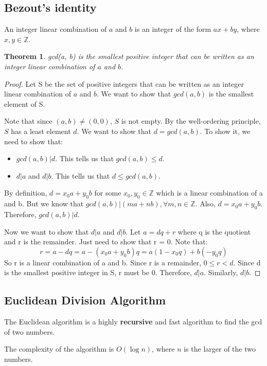 \documentclass[letterpaper,12pt,oneside]{article}
\newtheorem{theorem}{Theorem}
\begin{document}
\subsection{Bezout's identity}
An integer linear combination of $a$ and $b$ is an integer of the form $ax +
    by$, where $x, y \in \mathbb{Z}$.
\begin{theorem}
    gcd(a, b) is the smallest positive integer that can be written as an integer linear combination of $a$ and $b$.
\end{theorem}
\begin{proof}
    Let S be the set of positive integers that can be written as an integer linear combination of $a$ and $b$. We want to show that $gcd(a, b)$ is the smallest element of S.

    Note that since $(a, b) \neq (0, 0)$, $S$ is not empty. By the well-ordering
    principle, $S$ has a least element $d$. We want to show that $d = gcd(a, b)$.
    To show it, we need to show that: \begin{itemize}
        \item $gcd(a ,b) | d$. This tells us that $gcd(a, b) \leq d$.
        \item $d | a$ and $d | b$. This tells us that $d \leq gcd(a, b)$.
    \end{itemize}

    By definition, $d=x_0a+y_0b$ for some $x_0, y_0 \in \mathbb{Z}$ which is a
    linear combination of a and b. But we know that $gcd(a, b) | (ma + nb),\forall
        m, n \in \mathbb{Z}$. Also, $d = x_0a + y_0b$. Therefore, $gcd(a, b) | d$.

    Now we want to show that $d | a$ and $d | b$. Let $a=dq+r$ where q is the
    quotient and r is the remainder. Just need to show that r = 0. Note that: \[
        r = a - dq = a - (x_0a + y_0b)q = a(1-x_0q) + b(-y_0q)
    \]
    So r is a linear combination of a and b. Since r is a remainder, $0 \leq r <
        d$. Since d is the smallest positive integer in S, r must be 0. Therefore, $d |
        a$. Similarly, $d | b$.
\end{proof}

\subsection{Euclidean Division Algorithm}
The Euclidean algorithm is a highly \textbf{recursive} and fast algorithm to
find the gcd of two numbers.

The complexity of the algorithm is $O(\log n)$, where $n$ is the larger of the
two numbers.
\end{document}
